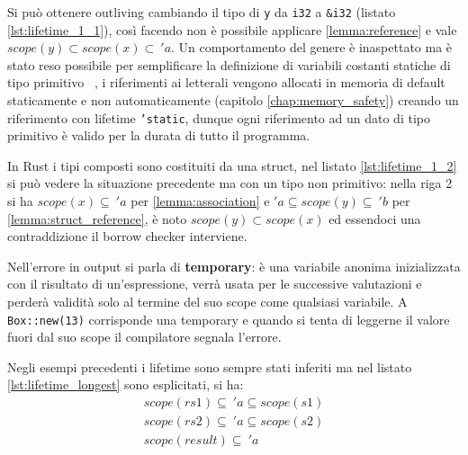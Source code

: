 \documentclass[Lau,binding=0.6cm]{sapthesis}
\newcommand{\textcode}[1]{\colorbox{backcolour}{\texttt{#1}}}
\begin{document}



Si può ottenere outliving cambiando il tipo di \textcode{y} da \textcode{i32} a \textcode{\&i32} (listato \ref{lst:lifetime_1_1}), così facendo non è possibile applicare \ref{lemma:reference} e vale $ scope(y) \subset scope(x) \subset \ 'a $. 
Un comportamento del genere è inaspettato ma è stato reso possibile per semplificare la definizione di variabili costanti statiche di tipo primitivo ~\cite{git:outliving_static}, i riferimenti ai letterali vengono allocati in memoria di default staticamente e non automaticamente (capitolo \ref{chap:memory_safety}) creando un riferimento con lifetime \textcode{'static}, dunque ogni riferimento ad un dato di tipo primitivo è valido per la durata di tutto il programma.




In Rust i tipi composti sono costituiti da una struct, nel listato \ref{lst:lifetime_1_2} si può vedere la situazione precedente ma con un tipo non primitivo: nella riga 2 si ha $ scope(x) \subseteq \ 'a $ per \ref{lemma:association} e $ 'a \subseteq scope(y) \subseteq \ 'b$ per \ref{lemma:struct_reference}, è noto $ scope(y) \subset scope(x) $ ed essendoci una contraddizione il borrow checker interviene.  




Nell'errore in output si parla di \textbf{temporary}: è una variabile anonima inizializzata con il risultato di un'espressione, verrà usata per le successive valutazioni e perderà validità solo al termine del suo scope come qualsiasi variabile. 
A \textcode{Box::new(13)} corrisponde una temporary e quando si tenta di leggerne il valore fuori dal suo scope il compilatore segnala l'errore. 

Negli esempi precedenti i lifetime sono sempre stati inferiti ma nel listato \ref{lst:lifetime_longest} sono esplicitati, si ha:
\begin{gather*}
    scope(rs1) \subseteq \ 'a \subseteq scope(s1) \\
    scope(rs2) \subseteq \ 'a \subseteq scope(s2) \\
    scope(result) \subseteq \ 'a \\
\end{gather*}
\end{document}
